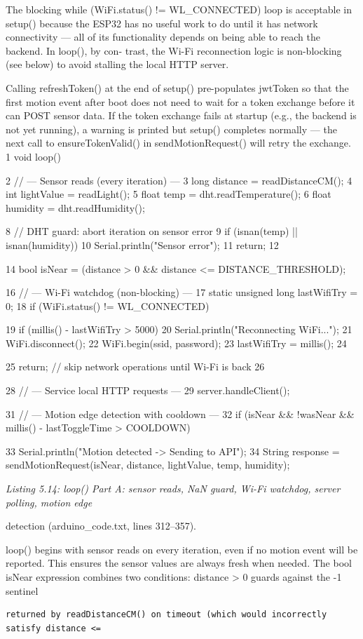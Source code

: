 The blocking while (WiFi.status() != WL\_CONNECTED) loop is acceptable in
setup() because the ESP32 has no useful work to do until it has network connectivity
--- all of its functionality depends on being able to reach the backend. In loop(), by con-
trast, the Wi-Fi reconnection logic is non-blocking (see below) to avoid stalling the local
HTTP server.

Calling refreshToken() at the end of setup() pre-populates jwtToken so that
the ﬁrst motion event after boot does not need to wait for a token exchange before it
can POST sensor data. If the token exchange fails at startup (e.g., the backend is not
yet running), a warning is printed but setup() completes normally --- the next call to
ensureTokenValid() in sendMotionRequest() will retry the exchange.
1 void loop() {
2 // --- Sensor reads (every iteration) ---
3 long distance = readDistanceCM();
4 int lightValue = readLight();
5 float temp = dht.readTemperature();
6 float humidity = dht.readHumidity();

8 // DHT guard: abort iteration on sensor error
9 if (isnan(temp) || isnan(humidity)) {
10 Serial.println("Sensor error");
11 return;
12 }


14 bool isNear = (distance > 0 \&\& distance <= DISTANCE\_THRESHOLD);

16 // --- Wi-Fi watchdog (non-blocking) ---
17 static unsigned long lastWifiTry = 0;
18 if (WiFi.status() != WL\_CONNECTED) {
19 if (millis() - lastWifiTry > 5000) {
20 Serial.println("Reconnecting WiFi...");
21 WiFi.disconnect();
22 WiFi.begin(ssid, password);
23 lastWifiTry = millis();
24 }




25 return; // skip network operations until Wi-Fi is back
26 }


28 // --- Service local HTTP requests ---
29 server.handleClient();

31 // --- Motion edge detection with cooldown ---
32 if (isNear \&\& !wasNear \&\& millis() - lastToggleTime > COOLDOWN) {
33 Serial.println("Motion detected -> Sending to API");
34 String response = sendMotionRequest(isNear, distance, lightValue, temp,
humidity);


\textit{Listing 5.14: loop() Part A: sensor reads, NaN guard, Wi-Fi watchdog, server polling, motion edge}

detection (arduino\_code.txt, lines 312--357).


loop() begins with sensor reads on every iteration, even if no motion event will
be reported. This ensures the sensor values are always fresh when needed. The bool
isNear expression combines two conditions: distance > 0 guards against the -1 sentinel
\begin{lstlisting}
returned by readDistanceCM() on timeout (which would incorrectly satisfy distance <=
\end{lstlisting}

}}
